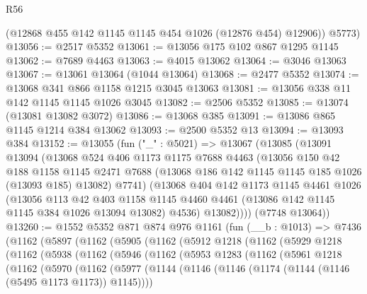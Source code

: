 \begin{lexlean}{R56}
\begin{coremodule}
        (@12868 @455 @142 @1145 @1145 @454 @1026 (@12876 @454) @12906))
      @5773)
@13056 := @2517 @5352
@13061 := @13056 @175 @102 @867 @1295 @1145
@13062 := @7689 @4463
@13063 := @4015 @13062
@13064 := @3046 @13063
@13067 := @13061 @13064 (@1044 @13064)
@13068 := @2477 @5352
@13074 := @13068 @341 @866 @1158 @1215 @3045 @13063
@13081 := @13056 @338 @11 @142 @1145 @1145 @1026 @3045
@13082 := @2506 @5352
@13085 := @13074 (@13081 @13082 @3072)
@13086 := @13068 @385
@13091 := @13086 @865 @1145 @1214 @384 @13062
@13093 := @2500 @5352 @13
@13094 := @13093 @384
@13152 := @13055
    (fun ("_" : @5021) =>
    @13067
      (@13085
        (@13091
          @13094
          (@13068
            @524
            @406
            @1173
            @1175
            @7688
            @4463
            (@13056
              @150
              @42
              @188
              @1158
              @1145
              @2471
              @7688
              (@13068 @186 @142 @1145 @1145 @185 @1026 (@13093 @185) @13082)
              @7741)
            (@13068
              @404
              @142
              @1173
              @1145
              @4461
              @1026
              (@13056
                @113
                @42
                @403
                @1158
                @1145
                @4460
                @4461
                (@13086 @142 @1145 @1145 @384 @1026 @13094 @13082)
                @4536)
              @13082))))
      (@7748 @13064))
@13260 := @1552
    @5352
    @871
    @874
    @976
    @1161
    (fun (__b : @1013) =>
    @7436
      (@1162
        (@5897
          (@1162
            (@5905
              (@1162
                (@5912
                  @1218
                  (@1162
                    (@5929
                      @1218
                      (@1162
                        (@5938
                          (@1162
                            (@5946
                              (@1162
                                (@5953
                                  @1283
                                  (@1162
                                    (@5961
                                      @1218
                                      (@1162
                                        (@5970
                                          (@1162
                                            (@5977
                                              (@1144
                                                (@1146
                                                  (@1146
                                                    (@1174
                                                      (@1144 (@1146 (@5495 @1173 @1173)) @1145))))

\end{coremodule}
\end{lexlean}
